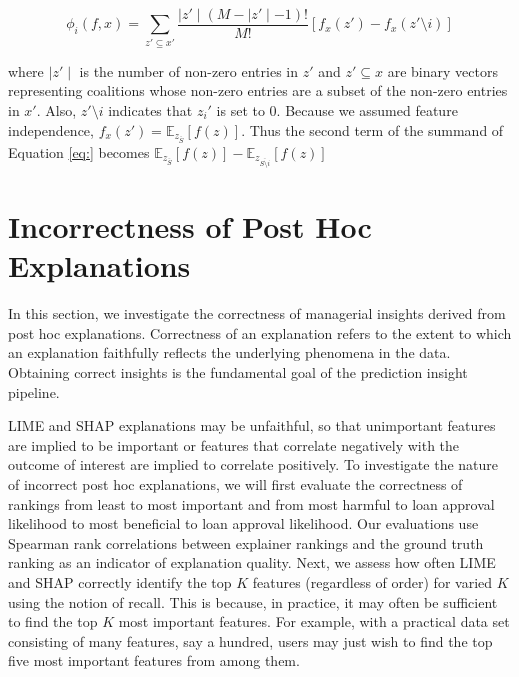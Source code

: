 \documentclass[12pt]{article}    %
\def\pipeline{prediction insight pipeline}
\begin{document}
\begin{equation}
    \phi_i(f,x) = \sum_{z' \subseteq x'} \frac{\mid z'\mid(M-\mid z'\mid - 1)!}{M!}[f_x(z') - f_x(z'\setminus i)]
\end{equation}

where $\mid z'\mid$ is the number of non-zero entries in $z'$ and $z'\subseteq x$ are binary vectors representing coalitions whose non-zero entries are a subset of the non-zero entries in $x'$. Also, $z'\setminus i$ indicates that $z_i'$ is set to 0. Because we assumed feature independence, $f_x(z') = \mathds{E}_{z_{\bar{S}}}[f(z)]$. Thus the second term of the summand of Equation \ref{eq:} becomes $\mathds{E}_{z_{\bar{S}}}[f(z)] - \mathds{E}_{z_{\bar{S\setminus{i}}}}[f(z)]$

 


\section*{Incorrectness of Post Hoc Explanations}
    In this section, we investigate the correctness of managerial insights derived from post hoc explanations. Correctness of an explanation refers to the extent to which an explanation faithfully reflects the underlying phenomena in the data. Obtaining correct insights is the fundamental goal of the \pipeline. %
    
    LIME and SHAP explanations may be unfaithful, so that unimportant features are implied to be important or features that correlate negatively with the outcome of interest are implied to correlate positively. To investigate the nature of incorrect post hoc explanations, we will first evaluate the correctness of rankings from least to most important and from most harmful to loan approval likelihood to most beneficial to loan approval likelihood. %
    Our evaluations use Spearman rank correlations \citep{MyersJeromeL2010Rdas} between explainer rankings and the ground truth ranking as an indicator of explanation quality. Next, we assess how often LIME and SHAP correctly identify the top $K$ features (regardless of order) for varied $K$ using the notion of recall. This is because, in practice, it may often be sufficient to find the top $K$ most important features. For example, with a practical data set consisting of many features, say a hundred, users may just wish to find the top five most important features from among them. 
\end{document}

